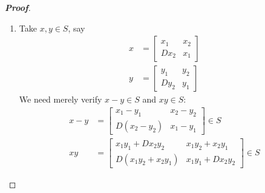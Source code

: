 \documentclass[12pt,leqno]{book}
\theoremstyle{definition}
\newenvironment{Proof}{\begin{proof}[\textnormal{\textbf{Proof}}]}{\end{proof}}
\begin{document}
\begin{enumerate}
\begin{Proof}
 \begin{enumerate}
  \item Take $x,y\in S$, say \begin{align*}x&=\begin{bmatrix}x_1&x_2\\Dx_2&x_1\end{bmatrix}\\y&=\begin{bmatrix}y_1&y_2\\Dy_2&y_1\end{bmatrix}\end{align*} We need merely verify $x-y\in S$ and $xy\in S$: \begin{align*}x-y&=\begin{bmatrix}x_1-y_1&x_2-y_2\\D(x_2-y_2)&x_1-y_1\end{bmatrix}\in S\\xy&=\begin{bmatrix}x_1y_1+Dx_2y_2&x_1y_2+x_2y_1\\D(x_1y_2+x_2y_1)&x_1y_1+Dx_2y_2\end{bmatrix}\in S\end{align*}

\end{enumerate}
\end{Proof}
\end{enumerate}
\end{document}
